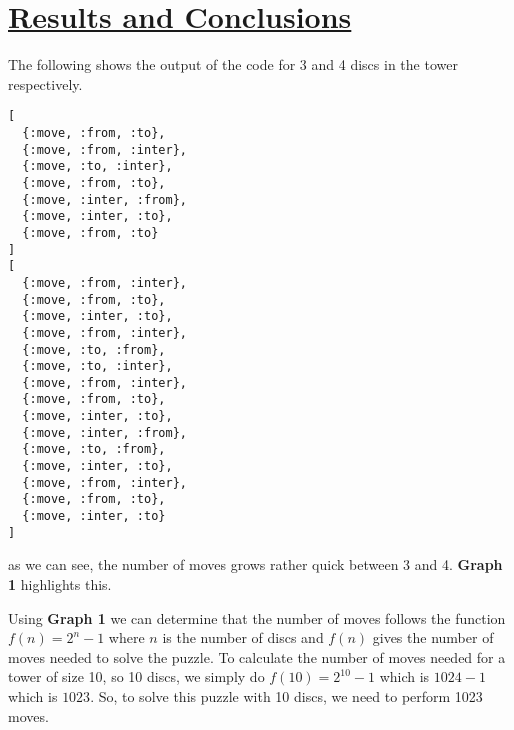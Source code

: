 \documentclass[a4paper,11pt]{article}
\begin{document}
\section*{
	\underline{Results and Conclusions}
}
The following shows the output of the code for 3 and 4 discs in the tower respectively.
\begin{verbatim}
[
  {:move, :from, :to},
  {:move, :from, :inter},
  {:move, :to, :inter},
  {:move, :from, :to},
  {:move, :inter, :from},
  {:move, :inter, :to},
  {:move, :from, :to}
]
[
  {:move, :from, :inter},
  {:move, :from, :to},
  {:move, :inter, :to},
  {:move, :from, :inter},
  {:move, :to, :from},
  {:move, :to, :inter},
  {:move, :from, :inter},
  {:move, :from, :to},
  {:move, :inter, :to},
  {:move, :inter, :from},
  {:move, :to, :from},
  {:move, :inter, :to},
  {:move, :from, :inter},
  {:move, :from, :to},
  {:move, :inter, :to}
]
\end{verbatim}
as we can see, the number of moves grows rather quick between 3 and 4. \textbf{Graph 1} highlights this.


Using \textbf{Graph 1} we can determine that the number of moves follows the function $f(n) = 2^n - 1$ where $n$ is the number of discs and $f(n)$ gives the number of moves needed to solve the puzzle. To calculate the number of moves needed for a tower of size 10, so 10 discs, we simply do $f(10) = 2^{10} -1$ which is $1024 -1$ which is $1023$. So, to solve this puzzle with 10 discs, we need to perform 1023 moves.
\end{document}

